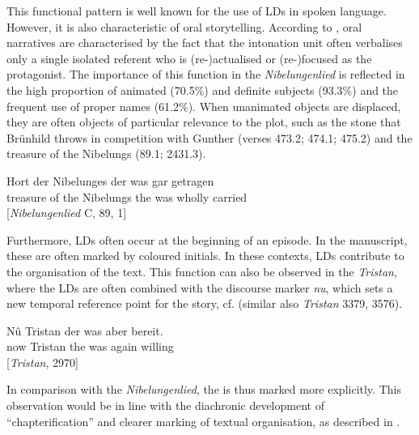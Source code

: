 \documentclass[output=paper,colorlinks,citecolor=brown]{langscibook}
\begin{document}
This functional pattern is well known for the use of LDs in spoken language. However, it is also characteristic of oral storytelling. According to \citet[67]{Chafe1994}, oral narratives are characterised by the fact that the intonation unit often verbalises only a single isolated referent who is (re-)actualised or (re-)focused as the protagonist. The importance of this function in the \textit{Nibelungenlied} is reflected in the high proportion of animated (70.5\%) and definite subjects (93.3\%) and the frequent use of proper names (61.2\%). When unanimated objects are displaced, they are often objects of particular relevance to the plot, such as the stone that Brünhild throws in competition with Gunther (verses 473.2; 474.1; 475.2) and the treasure of the Nibelungs (89.1; 2431.3).

\ea \label{ex:zeman:4}
\gll Hort {der Nibelunges} der was gar getragen \\
treasure {of the Nibelungs} the was wholly carried\\
\glt \hfill [\textit{Nibelungenlied} C, 89, 1]
\z

Furthermore, LDs often occur at the beginning of an episode. In the manuscript, these are often marked by coloured initials. In these contexts, LDs contribute to the organisation of the text. This function can also be observed in the \textit{Tristan}, where the LDs are often combined with the discourse marker \textit{nu}, which sets a new temporal reference point for the story, cf.  (similar also \textit{Tristan} 3379, 3576).

\ea \label{ex:zeman:5}
\gll Nû Tristan der was aber bereit. \\
now Tristan the was again willing\\ 
\glt \hfill [\textit{Tristan}, 2970]
\z

In comparison with the \textit{Nibelungenlied}, the  is thus marked more explicitly. This observation would be in line with the diachronic development of “chapterification” \citep{Fludernik2003} and clearer marking of textual organisation, as described in . 
\end{document}
